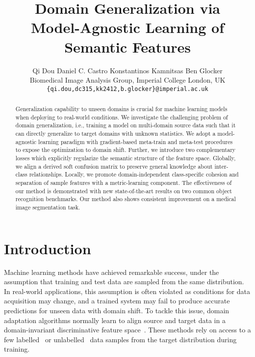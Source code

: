 \documentclass{article}
\title{Domain Generalization via\\Model-Agnostic Learning of Semantic Features}
\author{
Qi Dou
\quad Daniel C. Castro
\quad Konstantinos Kamnitsas
\quad Ben Glocker \\
Biomedical Image Analysis Group, Imperial College London, UK \\
\texttt{\{qi.dou,dc315,kk2412,b.glocker\}@imperial.ac.uk}
}
\begin{document}
\maketitle

\begin{abstract}

Generalization capability to unseen domains is crucial for machine learning models when deploying to real-world conditions. We investigate the challenging problem of domain generalization, i.e., training a model on multi-domain source data such that it can directly generalize to target domains with unknown statistics. 
We adopt a model-agnostic learning paradigm with gradient-based meta-train and meta-test procedures to expose the optimization to domain shift.
Further, we introduce two complementary losses which explicitly regularize the semantic structure of the feature space. Globally, we align a derived soft confusion matrix to preserve general knowledge about inter-class relationships. Locally, we promote domain-independent class-specific cohesion and separation of sample features with a metric-learning component.
The effectiveness of our method is demonstrated with new state-of-the-art results on two common object recognition benchmarks. Our method also shows consistent improvement on a medical image segmentation task.



\end{abstract}

\section{Introduction}

Machine learning methods have achieved remarkable success, under the assumption that training and test data are sampled from the same distribution. In real-world applications, this assumption is often violated as conditions for data acquisition may change, and a trained system may fail to produce accurate predictions for unseen data with domain shift. To tackle this issue, domain adaptation algorithms normally learn to align source and target data in a domain-invariant discriminative feature space~\citep{kumar2010co,ganin2016domain,hoffman2018cycada,long2016unsupervised,luo2018taking,saenko2010adapting,saito2018maximum,tzeng2015simultaneous,tzeng2017adversarial}. These methods rely on access to a few labelled~\citep{kumar2010co,saenko2010adapting,tzeng2015simultaneous} or unlabelled~\citep{ganin2016domain,hoffman2018cycada,long2016unsupervised,luo2018taking,saito2018maximum,tzeng2017adversarial} data samples from the target distribution during training.
\end{document}
